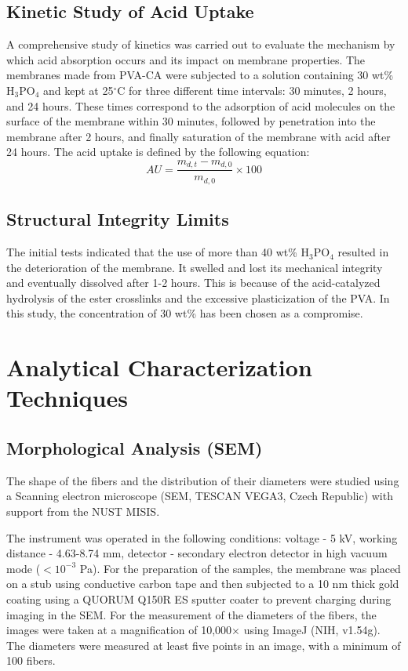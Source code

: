\documentclass[12pt,a4paper]{report}
\begin{document}
\subsection{Kinetic Study of Acid Uptake}
A comprehensive study of kinetics was carried out to evaluate the mechanism by which acid absorption occurs and its impact on membrane properties. The membranes made from PVA-CA were subjected to a solution containing 30 wt\% H\(_3\)PO\(_4\) and kept at 25\(^\circ\)C for three different time intervals: 30 minutes, 2 hours, and 24 hours. These times correspond to the adsorption of acid molecules on the surface of the membrane within 30 minutes, followed by penetration into the membrane after 2 hours, and finally saturation of the membrane with acid after 24 hours.\cite{35,52} The acid uptake is defined by the following equation:
\[
AU = \frac{m_{d,t}-m_{d,0}}{m_{d,0}} \times 100 \tag{3.3}
\]

\subsection{Structural Integrity Limits}
The initial tests indicated that the use of more than 40 wt\% H\(_3\)PO\(_4\) resulted in the deterioration of the membrane. It swelled and lost its mechanical integrity and eventually dissolved after 1-2 hours. This is because of the acid-catalyzed hydrolysis of the ester crosslinks and the excessive plasticization of the PVA.\cite{35,58} In this study, the concentration of 30 wt\% has been chosen as a compromise.

\section{Analytical Characterization Techniques}
\subsection{Morphological Analysis (SEM)}
The shape of the fibers and the distribution of their diameters were studied using a Scanning electron microscope (SEM, TESCAN VEGA3, Czech Republic) with support from the NUST MISIS.

The instrument was operated in the following conditions: voltage - 5 kV, working distance - 4.63-8.74 mm, detector - secondary electron detector in high vacuum mode (\(<10^{-3}\) Pa).
For the preparation of the samples, the membrane was placed on a stub using conductive carbon tape and then subjected to a 10 nm thick gold coating using a QUORUM Q150R ES sputter coater to prevent charging during imaging in the SEM.\cite{39}
For the measurement of the diameters of the fibers, the images were taken at a magnification of 10,000\(\times\) using ImageJ (NIH, v1.54g). The diameters were measured at least five points in an image, with a minimum of 100 fibers.
\end{document}
